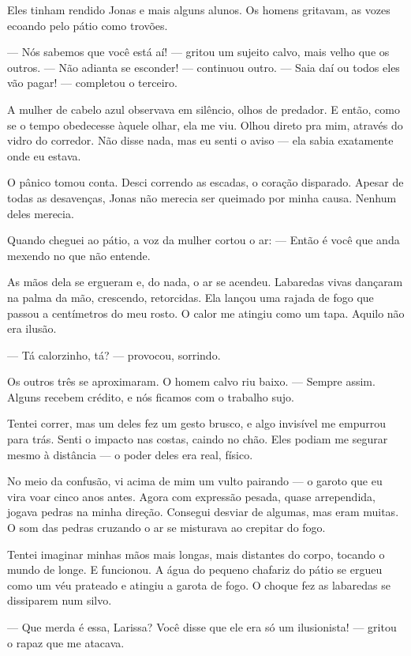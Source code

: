 Eles tinham rendido Jonas e mais alguns alunos.  
Os homens gritavam, as vozes ecoando pelo pátio como trovões.

— Nós sabemos que você está aí! — gritou um sujeito calvo, mais velho que os outros.  
— Não adianta se esconder! — continuou outro.  
— Saia daí ou todos eles vão pagar! — completou o terceiro.

A mulher de cabelo azul observava em silêncio, olhos de predador.  
E então, como se o tempo obedecesse àquele olhar, ela me viu.  
Olhou direto pra mim, através do vidro do corredor.  
Não disse nada, mas eu senti o aviso — ela sabia exatamente onde eu estava.

O pânico tomou conta.  
Desci correndo as escadas, o coração disparado.  
Apesar de todas as desavenças, Jonas não merecia ser queimado por minha causa.  
Nenhum deles merecia.

Quando cheguei ao pátio, a voz da mulher cortou o ar:  
— Então é você que anda mexendo no que não entende.

As mãos dela se ergueram e, do nada, o ar se acendeu.  
Labaredas vivas dançaram na palma da mão, crescendo, retorcidas.  
Ela lançou uma rajada de fogo que passou a centímetros do meu rosto.  
O calor me atingiu como um tapa.  
Aquilo não era ilusão.

— Tá calorzinho, tá? — provocou, sorrindo.

Os outros três se aproximaram.  
O homem calvo riu baixo.  
— Sempre assim. Alguns recebem crédito, e nós ficamos com o trabalho sujo.

Tentei correr, mas um deles fez um gesto brusco, e algo invisível me empurrou para trás.  
Senti o impacto nas costas, caindo no chão.  
Eles podiam me segurar mesmo à distância — o poder deles era real, físico.

No meio da confusão, vi acima de mim um vulto pairando — o garoto que eu vira voar cinco anos antes.
Agora com expressão pesada, quase arrependida, jogava pedras na minha direção.  
Consegui desviar de algumas, mas eram muitas.  
O som das pedras cruzando o ar se misturava ao crepitar do fogo.

Tentei imaginar minhas mãos mais longas, mais distantes do corpo, tocando o mundo de longe.  
E funcionou.  
A água do pequeno chafariz do pátio se ergueu como um véu prateado e atingiu a garota de fogo.  
O choque fez as labaredas se dissiparem num silvo.

— Que merda é essa, Larissa? Você disse que ele era só um ilusionista! — gritou o rapaz que me atacava.

